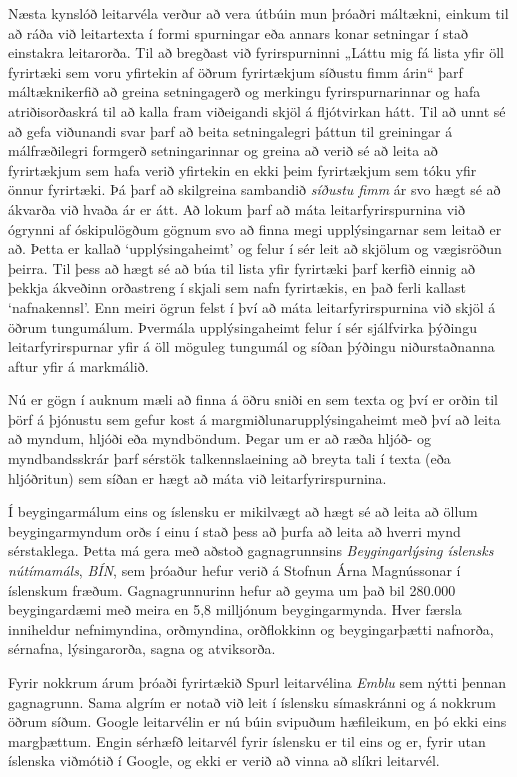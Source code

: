 \documentclass{../../metanetpaper}
\begin{document}
\begin{multicols}{2}
Næsta kynslóð leitarvéla verður að vera útbúin mun þróaðri máltækni, einkum til að ráða við leitartexta í formi spurningar eða annars konar setningar í stað einstakra leitarorða. Til að bregðast við fyrirspurninni „Láttu mig fá lista yfir öll fyrirtæki sem voru yfirtekin af öðrum fyrirtækjum síðustu fimm árin“ þarf máltæknikerfið að greina setningagerð og merkingu fyrirspurnarinnar og hafa atriðisorðaskrá til að kalla fram viðeigandi skjöl á fljótvirkan hátt. Til að unnt sé að gefa viðunandi svar þarf að beita setningalegri þáttun til greiningar á málfræðilegri formgerð setningarinnar og greina að verið sé að leita að fyrirtækjum sem hafa verið yfirtekin en ekki þeim fyrirtækjum sem tóku yfir önnur fyrirtæki. Þá þarf að skilgreina sambandið  \textit{síðustu fimm} ár svo hægt sé að ákvarða við hvaða ár er átt. Að lokum þarf að máta leitarfyrirspurnina við ógrynni af óskipulögðum gögnum svo að finna megi upplýsingarnar sem leitað er að. Þetta er kallað ‘upplýsingaheimt’ og felur í sér leit að skjölum og vægisröðun þeirra. Til þess að hægt sé að búa til lista yfir fyrirtæki þarf kerfið einnig að þekkja ákveðinn orðastreng í skjali sem nafn fyrirtækis, en það ferli kallast ‘nafnakennsl’.  Enn meiri ögrun felst í því að máta leitarfyrirspurnina við skjöl á öðrum tungumálum. Þvermála upplýsingaheimt felur í sér sjálfvirka þýðingu leitarfyrirspurnar yfir á öll möguleg tungumál og síðan þýðingu niðurstaðnanna aftur yfir á markmálið.

Nú er gögn í auknum mæli að finna á öðru sniði en sem texta og því er orðin til þörf á þjónustu sem gefur kost á margmiðlunarupplýsingaheimt með því að leita að myndum, hljóði eða myndböndum. Þegar um er að ræða hljóð- og myndbandsskrár þarf sérstök talkennslaeining að breyta tali í texta (eða hljóðritun) sem síðan er hægt að máta við leitarfyrirspurnina.

Í beygingarmálum eins og íslensku er mikilvægt að hægt sé að leita að öllum beygingarmyndum orðs í einu í stað þess að þurfa að leita að hverri mynd sérstaklega. Þetta má gera með aðstoð gagnagrunnsins \textit{Beygingarlýsing íslensks nútímamáls}, \textit{BÍN}\cite{bin1}, sem þróaður hefur verið á Stofnun Árna Magnússonar í íslenskum fræðum. Gagnagrunnurinn hefur að geyma um það bil 280.000 beygingardæmi með meira en 5,8 milljónum beygingarmynda. Hver færsla inniheldur nefnimyndina, orðmyndina, orðflokkinn og beygingarþætti nafnorða, sérnafna, lýsingarorða, sagna og atviksorða.

Fyrir nokkrum árum þróaði fyrirtækið Spurl leitarvélina \textit{Emblu} sem nýtti þennan gagnagrunn. Sama algrím er notað við leit í íslensku símaskránni og á nokkrum öðrum síðum. Google leitarvélin er nú búin svipuðum hæfileikum, en þó ekki eins margþættum. Engin sérhæfð leitarvél fyrir íslensku er til eins og er, fyrir utan íslenska viðmótið í Google, og ekki er verið að vinna að slíkri leitarvél.
  

\end{multicols}
\end{document}

